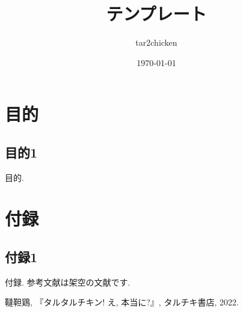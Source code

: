 \documentclass[dvipdfmx]{jsarticle}
\title{テンプレート}
\author{tar2chicken}
\date{\today}
\begin{document}
\maketitle
\tableofcontents
\clearpage
\section{目的}
	\subsection{目的1}
		目的.


\section{付録}
	\subsection{付録1}
		付録.
		参考文献は架空の文献です.
		\clearpage
		\begin{thebibliography}{9}
			 韃靼鶏, 『タルタルチキン! え, 本当に?』, タルチキ書店, 2022.
		\end{thebibliography}
\end{document}
